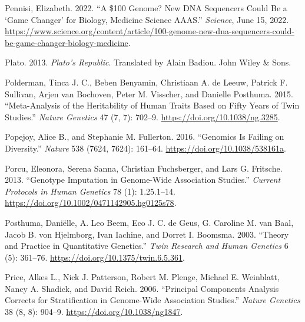 \documentclass[
]{book}
\newlength{\cslhangindent}
\newlength{\cslentryspacingunit} %
\newenvironment{CSLReferences}[2] %
 {%
  \setlength{\parindent}{0pt}
  \ifodd #1
  \let\oldpar\par
  \def\par{\hangindent=\cslhangindent\oldpar}
  \fi
  \setlength{\parskip}{#2\cslentryspacingunit}
 }%
 {}
\begin{document}
\begin{CSLReferences}{1}{0}
\leavevmode{}%
Pennisi, Elizabeth. 2022. {``A \$100 Genome? {New DNA} Sequencers Could Be a {`Game Changer'} for Biology, Medicine \textbar{} {Science} \textbar{} {AAAS}.''} \emph{Science}, June 15, 2022. \url{https://www.science.org/content/article/100-genome-new-dna-sequencers-could-be-game-changer-biology-medicine}.

\leavevmode{}%
Plato. 2013. \emph{Plato's {Republic}}. Translated by Alain Badiou. {John Wiley \& Sons}.

\leavevmode{}%
Polderman, Tinca J. C., Beben Benyamin, Christiaan A. de Leeuw, Patrick F. Sullivan, Arjen van Bochoven, Peter M. Visscher, and Danielle Posthuma. 2015. {``Meta-Analysis of the Heritability of Human Traits Based on Fifty Years of Twin Studies.''} \emph{Nature Genetics} 47 (7, 7): 702--9. \url{https://doi.org/10.1038/ng.3285}.

\leavevmode{}%
Popejoy, Alice B., and Stephanie M. Fullerton. 2016. {``Genomics Is Failing on Diversity.''} \emph{Nature} 538 (7624, 7624): 161--64. \url{https://doi.org/10.1038/538161a}.

\leavevmode{}%
Porcu, Eleonora, Serena Sanna, Christian Fuchsberger, and Lars G. Fritsche. 2013. {``Genotype {Imputation} in {Genome-Wide Association Studies}.''} \emph{Current Protocols in Human Genetics} 78 (1): 1.25.1--14. \url{https://doi.org/10.1002/0471142905.hg0125s78}.

\leavevmode{}%
Posthuma, Daniëlle, A. Leo Beem, Eco J. C. de Geus, G. Caroline M. van Baal, Jacob B. von Hjelmborg, Ivan Iachine, and Dorret I. Boomsma. 2003. {``Theory and {Practice} in {Quantitative Genetics}.''} \emph{Twin Research and Human Genetics} 6 (5): 361--76. \url{https://doi.org/10.1375/twin.6.5.361}.

\leavevmode{}%
Price, Alkes L., Nick J. Patterson, Robert M. Plenge, Michael E. Weinblatt, Nancy A. Shadick, and David Reich. 2006. {``Principal Components Analysis Corrects for Stratification in Genome-Wide Association Studies.''} \emph{Nature Genetics} 38 (8, 8): 904--9. \url{https://doi.org/10.1038/ng1847}.


\end{CSLReferences}
\end{document}
